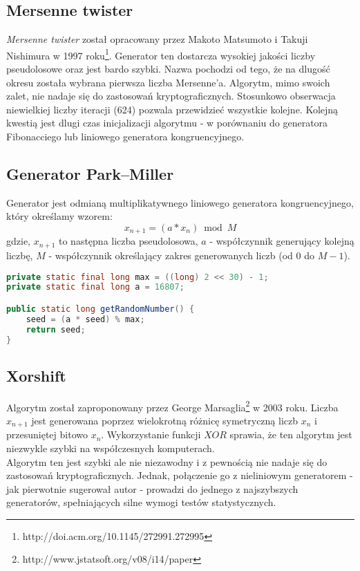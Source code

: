 \documentclass[a4paper, 11pt]{article} %
\begin{document}
\subsection{Mersenne twister}
\textit{Mersenne twister} został opracowany przez Makoto Matsumoto i Takuji Nishimura w 1997 roku\footnote{http://doi.acm.org/10.1145/272991.272995}. Generator ten dostarcza wysokiej jakości liczby pseudolosowe oraz jest bardo szybki. Nazwa pochodzi od tego, że na dlugość okresu została wybrana pierwsza liczba Mersenne'a. Algorytm, mimo swoich zalet, nie nadaje się do zastosowań kryptograficznych. Stosunkowo obserwacja niewielkiej liczby iteracji (624) pozwala przewidzieć wszystkie kolejne. Kolejną kwestią jest dlugi czas inicjalizacji algorytmu - w porównaniu do generatora Fibonacciego lub liniowego generatora kongruencyjnego. 
\subsection{Generator Park–Miller}
Generator jest odmianą multiplikatywnego liniowego generatora kongruencyjnego, który określamy wzorem:
\[ x_{n+1} = (a * x_{n}) \bmod M \]
gdzie, $x_{n+1}$ to następna liczba pseudolosowa, $a$ - współczynnik generujący kolejną liczbę, $M$ - współczynnik określający zakres generowanych liczb (od $0$ do $M-1$).
\begin{lstlisting}[style=mystyle, language=java, frame=single, caption = Generowanie następnej liczby pseudolosowej przez algorytm Parka-Millera.]
private static final long max = ((long) 2 << 30) - 1;
private static final long a = 16807;

public static long getRandomNumber() {
    seed = (a * seed) % max;
    return seed;
}
\end{lstlisting}
\subsection{Xorshift}
Algorytm został zaproponowany przez George Marsaglia\footnote{http://www.jstatsoft.org/v08/i14/paper} w 2003 roku. Liczba $x_{n+1}$ jest generowana poprzez wielokrotną różnicę symetryczną liczb $x_{n}$ i przesuniętej bitowo $x_{n}$. Wykorzystanie funkcji $XOR$ sprawia, że ten algorytm jest niezwykle szybki na współczesnych komputerach.
\\
Algorytm ten jest szybki ale nie niezawodny i z pewnością nie nadaje się do zastosowań kryptograficznych. Jednak, połączenie go z nieliniowym generatorem - jak pierwotnie sugerował autor - prowadzi do jednego z najszybszych generatorów, spełniających silne wymogi testów statystycznych.
\end{document}
